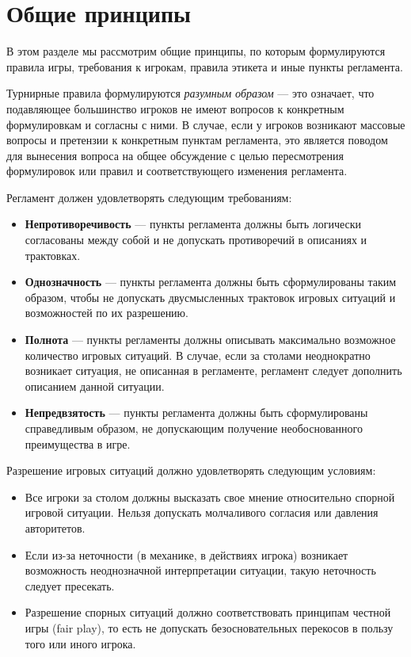 \section{Общие принципы}

\begin{additional}

В этом разделе мы рассмотрим общие принципы, по которым формулируются правила игры, требования к игрокам, правила этикета и иные пункты регламента.

\vspace{0.3cm}

Турнирные правила формулируются \textit{разумным образом} --- это означает, что подавляющее большинство игроков не имеют вопросов к конкретным формулировкам и согласны с ними. В случае, если у игроков возникают массовые вопросы и претензии к конкретным пунктам регламента, это является поводом для вынесения вопроса на общее обсуждение с целью пересмотрения формулировок или правил и соответствующего изменения регламента.

\vspace{0.3cm}

Регламент должен удовлетворять следующим требованиям:
\begin{itemize}
	\item \textbf{Непротиворечивость} --- пункты регламента должны быть логически согласованы между собой и не допускать противоречий в описаниях и трактовках.
	\item \textbf{Однозначность} --- пункты регламента должны быть сформулированы таким образом, чтобы не допускать двусмысленных трактовок игровых ситуаций и возможностей по их разрешению.
	\item \textbf{Полнота} --- пункты регламенты должны описывать максимально возможное количество игровых ситуаций. В случае, если за столами неоднократно возникает ситуация, не описанная в регламенте, регламент следует дополнить описанием данной ситуации.
	\item \textbf{Непредвзятость} --- пункты регламента должны быть сформулированы справедливым образом, не допускающим получение необоснованного преимущества в игре.
\end{itemize}

\vspace{0.3cm}

Разрешение игровых ситуаций должно удовлетворять следующим условиям:
\begin{itemize}
	\item Все игроки за столом должны высказать свое мнение относительно спорной игровой ситуации. Нельзя допускать молчаливого согласия или давления авторитетов.
	\item Если из-за неточности (в механике, в действиях игрока) возникает возможность неоднозначной интерпретации ситуации, такую неточность следует пресекать.
	\item Разрешение спорных ситуаций должно соответствовать принципам честной игры (fair play), то есть не допускать безосновательных перекосов в пользу того или иного игрока.
\end{itemize}


\end{additional}
